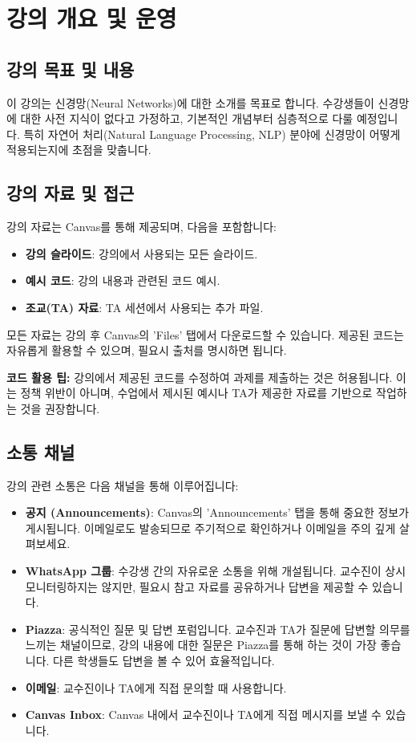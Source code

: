 \documentclass[11pt,a4paper]{article}
\theoremstyle{definition}
\begin{document}
\newpage
\section*{강의 개요 및 운영}

\subsection*{강의 목표 및 내용}
이 강의는 신경망(Neural Networks)에 대한 소개를 목표로 합니다.
수강생들이 신경망에 대한 사전 지식이 없다고 가정하고, 기본적인 개념부터 심층적으로 다룰 예정입니다.
특히 자연어 처리(Natural Language Processing, NLP) 분야에 신경망이 어떻게 적용되는지에 초점을 맞춥니다.

\subsection*{강의 자료 및 접근}
강의 자료는 Canvas를 통해 제공되며, 다음을 포함합니다:
\begin{itemize}
    \item \textbf{강의 슬라이드}: 강의에서 사용되는 모든 슬라이드.
    \item \textbf{예시 코드}: 강의 내용과 관련된 코드 예시.
    \item \textbf{조교(TA) 자료}: TA 세션에서 사용되는 추가 파일.
\end{itemize}
모든 자료는 강의 후 Canvas의 'Files' 탭에서 다운로드할 수 있습니다.
제공된 코드는 자유롭게 활용할 수 있으며, 필요시 출처를 명시하면 됩니다.

\begin{infobox}
\textbf{코드 활용 팁:}
강의에서 제공된 코드를 수정하여 과제를 제출하는 것은 허용됩니다.
이는 정책 위반이 아니며, 수업에서 제시된 예시나 TA가 제공한 자료를 기반으로 작업하는 것을 권장합니다.
\end{infobox}

\subsection*{소통 채널}
강의 관련 소통은 다음 채널을 통해 이루어집니다:
\begin{itemize}
    \item \textbf{공지 (Announcements)}: Canvas의 'Announcements' 탭을 통해 중요한 정보가 게시됩니다. 이메일로도 발송되므로 주기적으로 확인하거나 이메일을 주의 깊게 살펴보세요.
    \item \textbf{WhatsApp 그룹}: 수강생 간의 자유로운 소통을 위해 개설됩니다. 교수진이 상시 모니터링하지는 않지만, 필요시 참고 자료를 공유하거나 답변을 제공할 수 있습니다.
    \item \textbf{Piazza}: 공식적인 질문 및 답변 포럼입니다. 교수진과 TA가 질문에 답변할 의무를 느끼는 채널이므로, 강의 내용에 대한 질문은 Piazza를 통해 하는 것이 가장 좋습니다. 다른 학생들도 답변을 볼 수 있어 효율적입니다.
    \item \textbf{이메일}: 교수진이나 TA에게 직접 문의할 때 사용합니다.
    \item \textbf{Canvas Inbox}: Canvas 내에서 교수진이나 TA에게 직접 메시지를 보낼 수 있습니다.
\end{itemize}
\end{document}
